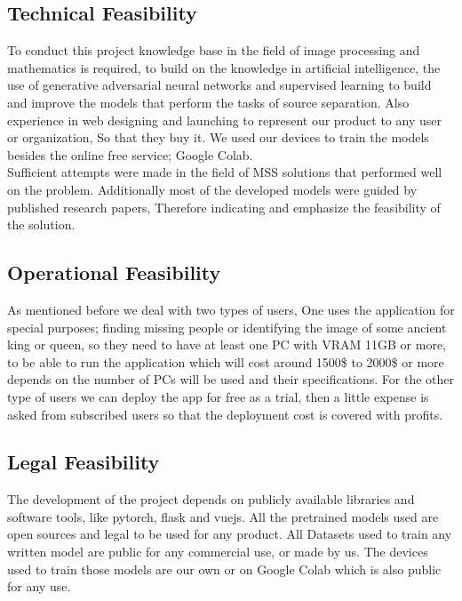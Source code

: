 \subsection{ Technical Feasibility}

To conduct this project knowledge base in the field of image processing and mathematics is required, to build on the knowledge in artificial intelligence, the use of generative adversarial neural networks and supervised learning to build and improve the models that perform the tasks of source separation. Also experience in web designing and launching to represent our product to any user or organization, So that they buy it. We used our devices to train the models besides the online free service; Google Colab. \\ 
Sufficient attempts were made in the field of MSS solutions that performed well on the problem. Additionally most of the developed models were guided by published research papers, Therefore indicating and emphasize the feasibility of the solution.

\subsection{ Operational Feasibility }

As mentioned before we deal with two types of users, One uses the application for special purposes; finding missing people or identifying the image of some ancient king or queen, so they need to have at least one PC with VRAM 11GB or more, to be able to run the application which will cost around 1500\$ to 2000\$ or more depends on the number of PCs will be used and their specifications. For the other type of users we can deploy the app for free as a trial, then a little expense is asked from subscribed users so that the deployment cost is covered with profits. 

\subsection{ Legal Feasibility }

The development of the project depends on publicly available libraries and software tools, like pytorch, flask and vuejs. All the pretrained models used are open sources and legal to be used for any product. All Datasets used to train any written model are public for any commercial use, or made by us. The devices used to train those models are our own or on Google Colab which is also public for any use.

